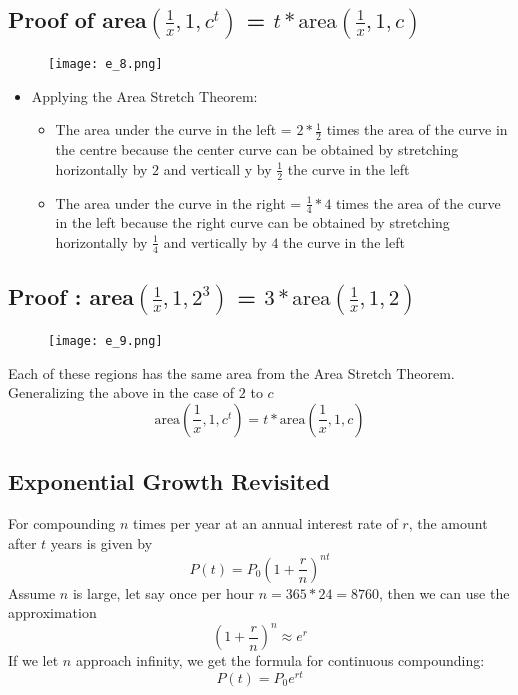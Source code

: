 \subsection{Proof of area\( \left( \frac{1}{x}, 1, c^{t} \right) \) = \(t*\text{area}(\frac{1}{x}, 1, c)\)}
\begin{figure}
  \centering
  \texttt{[image: e\_8.png]}
\end{figure}
\begin{itemize}
  \item Applying the Area Stretch Theorem:
  \begin{itemize}
    \item The area under the curve in the left  = \(2*\frac{1}{2}\) times the area of the curve in the centre because the center curve can be obtained by stretching horizontally by \(2\) and verticall y by \(\frac{1}{2}\) the curve in the left
  \item The area under the curve in the right  = \(\frac{1}{4}*4\) times the area of the curve in the left because the right curve can be obtained by stretching horizontally by \(\frac{1}{4}\) and vertically by \(4\) the curve in the left
\end{itemize}
\end{itemize}

\subsection{Proof : area\( \left( \frac{1}{x}, 1, 2^{3} \right) \) = \(3*\text{area}(\frac{1}{x}, 1, 2)\)}
\begin{figure}
  \centering
  \texttt{[image: e\_9.png]}
\end{figure}
Each of these regions has the same area from the Area Stretch Theorem.
Generalizing the above in the case of \(2\) to \( c \)
\[ \text{area}\left(\frac{1}{x}, 1, c^{t}\right) = t*\text{area}\left(\frac{1}{x}, 1, c\right) \]

\subsection{Exponential Growth Revisited}
For compounding \(n\) times per year at an annual interest rate of \(r\), the amount after \(t\) years is given by
\[ P(t) = P_{0}\left(1+\frac{r}{n}\right)^{nt} \]
Assume \(n\) is large, let say once per hour \(n= 365*24 = 8760\), then we can use the approximation
\[ \left(1+\frac{r}{n}\right)^{n} \approx e^{r} \]
If we let \(n\) approach infinity, we get the formula for continuous compounding:
\[ P(t) = P_{0}e^{rt} \]

